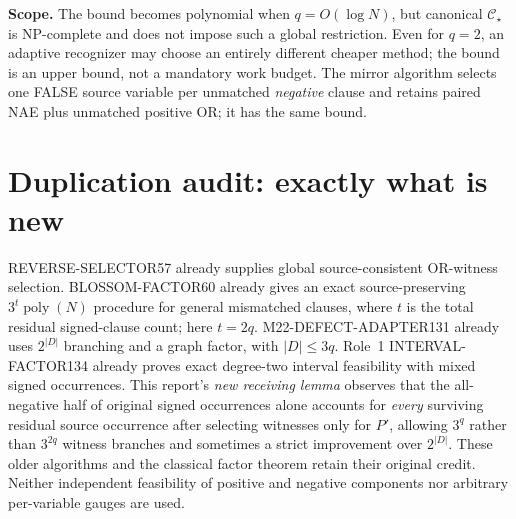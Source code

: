 \documentclass[11pt]{article}
\newcommand{\CS}{\mathcal C_{\star}}
\begin{document}
\noindent\textbf{Scope.} The bound becomes polynomial when $q=O(\log N)$, but canonical $\CS$ is NP-complete and does not impose such a global restriction. Even for $q=2$, an adaptive recognizer may choose an entirely different cheaper method; the bound is an upper bound, not a mandatory work budget. The mirror algorithm selects one FALSE source variable per unmatched \emph{negative} clause and retains paired NAE plus unmatched positive OR; it has the same bound.

\section{Duplication audit: exactly what is new}
REVERSE-SELECTOR57 already supplies global source-consistent OR-witness selection. BLOSSOM-FACTOR60 already gives an exact source-preserving $3^t\operatorname{poly}(N)$ procedure for general mismatched clauses, where $t$ is the total residual signed-clause count; here $t=2q$. M22-DEFECT-ADAPTER131 already uses $2^{|D|}$ branching and a graph factor, with $|D|\le3q$. Role~1 INTERVAL-FACTOR134 already proves exact degree-two interval feasibility with mixed signed occurrences. This report's \emph{new receiving lemma} observes that the all-negative half of original signed occurrences alone accounts for \emph{every} surviving residual source occurrence after selecting witnesses only for $P'$, allowing $3^q$ rather than $3^{2q}$ witness branches and sometimes a strict improvement over $2^{|D|}$. These older algorithms and the classical factor theorem retain their original credit. Neither independent feasibility of positive and negative components nor arbitrary per-variable gauges are used.
\end{document}
